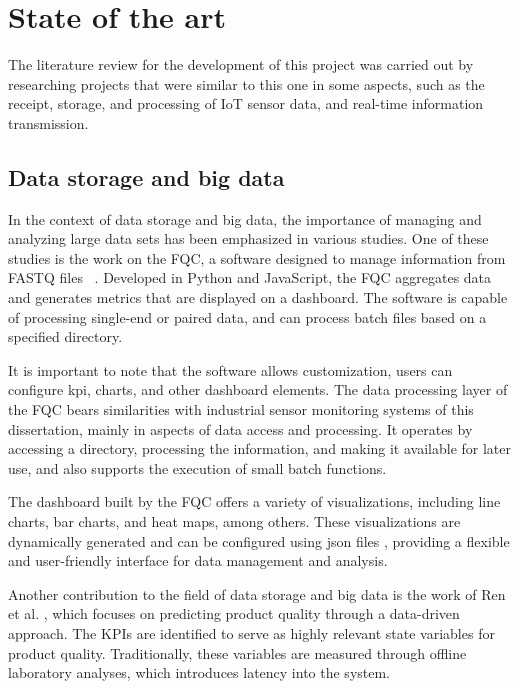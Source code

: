 \chapter{State of the art}\label{cap:conceptual}

The literature review for the development of this project was carried out by researching projects that were similar to this one in some aspects, such as the receipt, storage, and processing of \gls{IoT} sensor data, and real-time information transmission.

\section{Data storage and big data}

In the context of data storage and big data, the importance of managing and analyzing large data sets has been emphasized in various studies. One of these studies is the work on the \gls{FQC}, a software designed to manage information from FASTQ files ~\cite{fqc2017}. Developed in Python and JavaScript, the \gls{FQC} aggregates data and generates metrics that are displayed on a dashboard. The software is capable of processing single-end or paired data, and can process batch files based on a specified directory.

It is important to note that the software allows customization, users can configure \gls{kpi}, charts, and other dashboard elements. The data processing layer of the \gls{FQC} bears similarities with industrial sensor monitoring systems of this dissertation, mainly in aspects of data access and processing. It operates by accessing a directory, processing the information, and making it available for later use, and also supports the execution of small batch functions.

The dashboard built by the FQC offers a variety of visualizations, including line charts, bar charts, and heat maps, among others. These visualizations are dynamically generated and can be configured using \gls{json} files \cite{mdnJson}, providing a flexible and user-friendly interface for data management and analysis.

Another contribution to the field of data storage and big data is the work of Ren et al. \cite{ren2021data}, which focuses on predicting product quality through a data-driven approach. The \gls{KPIs} are identified to serve as highly relevant state variables for product quality. Traditionally, these variables are measured through offline laboratory analyses, which introduces latency into the system.

